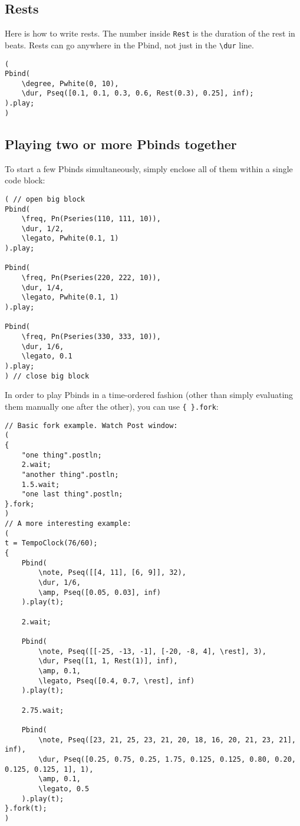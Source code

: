 \subsection{Rests}

Here is how to write rests. The number inside \texttt{Rest} is the duration of the rest in beats. Rests can go anywhere in the Pbind, not just in the \texttt{\textbackslash dur} line.

 
\begin{lstlisting}[style=SuperCollider-IDE, basicstyle=\scttfamily\footnotesize]
(
Pbind(
	\degree, Pwhite(0, 10),
	\dur, Pseq([0.1, 0.1, 0.3, 0.6, Rest(0.3), 0.25], inf);
).play;
)
\end{lstlisting}
 

\subsection{Playing two or more Pbinds together}

To start a few Pbinds simultaneously, simply enclose all of them within a single code block:
 
\begin{lstlisting}[style=SuperCollider-IDE, basicstyle=\scttfamily\footnotesize]
( // open big block
Pbind(
	\freq, Pn(Pseries(110, 111, 10)),
	\dur, 1/2,
	\legato, Pwhite(0.1, 1)
).play;

Pbind(
	\freq, Pn(Pseries(220, 222, 10)),
	\dur, 1/4,
	\legato, Pwhite(0.1, 1)
).play;

Pbind(
	\freq, Pn(Pseries(330, 333, 10)),
	\dur, 1/6,
	\legato, 0.1
).play;
) // close big block
\end{lstlisting}

In order to play Pbinds in a time-ordered fashion (other than simply evaluating them manually one after the other), you can use \texttt{\{ \}.fork}:

\begin{lstlisting}[style=SuperCollider-IDE, basicstyle=\scttfamily\footnotesize]
// Basic fork example. Watch Post window:
( 
{
	"one thing".postln;
	2.wait;
	"another thing".postln;
	1.5.wait;
	"one last thing".postln;
}.fork;
)
// A more interesting example:
(
t = TempoClock(76/60);
{
	Pbind(
		\note, Pseq([[4, 11], [6, 9]], 32),
		\dur, 1/6,
		\amp, Pseq([0.05, 0.03], inf)
	).play(t);
	
	2.wait;
	
	Pbind(
		\note, Pseq([[-25, -13, -1], [-20, -8, 4], \rest], 3),
		\dur, Pseq([1, 1, Rest(1)], inf),
		\amp, 0.1,
		\legato, Pseq([0.4, 0.7, \rest], inf)
	).play(t);

	2.75.wait;
	
	Pbind(
		\note, Pseq([23, 21, 25, 23, 21, 20, 18, 16, 20, 21, 23, 21], inf),
		\dur, Pseq([0.25, 0.75, 0.25, 1.75, 0.125, 0.125, 0.80, 0.20, 0.125, 0.125, 1], 1),
		\amp, 0.1,
		\legato, 0.5
	).play(t);
}.fork(t);
)
\end{lstlisting}
 
